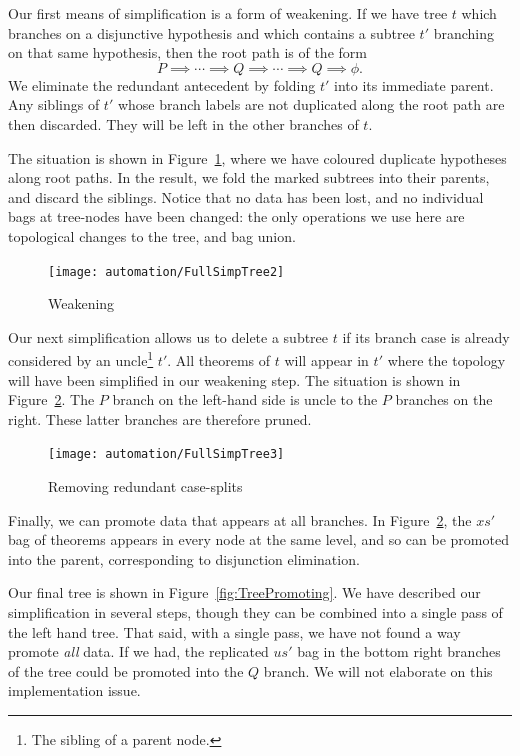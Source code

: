 Our first means of simplification is a form of weakening. If we have tree $t$ which branches on a disjunctive hypothesis and which contains a subtree $t'$ branching on that same hypothesis, then the root path is of the form 
\begin{displaymath}
P \implies \cdots \implies Q \implies \cdots \implies Q \implies \phi.
\end{displaymath}
We eliminate the redundant antecedent by folding $t'$ into its immediate parent. Any siblings of $t'$ whose branch labels are not duplicated along the root path are then discarded. They will be left in the other branches of $t$.

The situation is shown in Figure~\ref{fig:TreeWeakening}, where we have coloured duplicate hypotheses along root paths. In the result, we fold the marked subtrees into their parents, and discard the siblings. Notice that no data has been lost, and no individual bags at tree-nodes have been changed: the only operations we use here are topological changes to the tree, and bag union.

\begin{figure}
\centering\texttt{[image: automation/FullSimpTree2]}
\caption{Weakening}
\label{fig:TreeWeakening}
\end{figure}

Our next simplification allows us to delete a subtree $t$ if its branch case is already considered by an uncle\footnote{The sibling of a parent node.} $t'$. All theorems of $t$ will appear in $t'$ where the topology will have been simplified in our weakening step. The situation is shown in Figure~\ref{fig:TreeRedundantSplits}. The $P$ branch on the left-hand side is uncle to the $P$ branches on the right. These latter branches are therefore pruned.

\begin{figure}
\centering\texttt{[image: automation/FullSimpTree3]}
\caption{Removing redundant case-splits}
\label{fig:TreeRedundantSplits}
\end{figure}

Finally, we can promote data that appears at all branches. In Figure~\ref{fig:TreeRedundantSplits}, the $xs'$ bag of theorems appears in every node at the same level, and so can be promoted into the parent, corresponding to disjunction elimination. 

Our final tree is shown in Figure~\ref{fig:TreePromoting}. We have described our simplification in several steps, though they can be combined into a single pass of the left hand tree. That said, with a single pass, we have not found a way promote \emph{all} data. If we had, the replicated $us'$ bag in the bottom right branches of the tree could be promoted into the $Q$ branch. We will not elaborate on this implementation issue.

